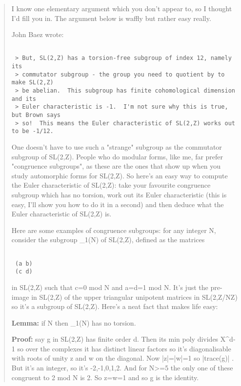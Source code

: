 \begin{quote}
 I know one elementary argument which you don't appear to, so I thought
 I'd fill you in. The argument below is waffly but rather easy really.

 John Baez wrote:


\begin{verbatim}

 > But, SL(2,Z) has a torsion-free subgroup of index 12, namely its
 > commutator subgroup - the group you need to quotient by to make SL(2,Z)
 > be abelian.  This subgroup has finite cohomological dimension and its
 > Euler characteristic is -1.  I'm not sure why this is true, but Brown says
 > so!  This means the Euler characteristic of SL(2,Z) works out to be -1/12.
\end{verbatim}
    

 One doesn't have to use such a "strange" subgroup as the commutator
 subgroup of SL(2,Z). People who do modular forms, like me, far
 prefer "congruence subgroups", as these are the ones that show
 up when you study automorphic forms for SL(2,Z). So here's an easy
 way to compute the Euler characteristic of SL(2,Z): take your
 favourite congruence subgroup which has no torsion, work out
 its Euler characteristic (this is easy, I'll show you how to do it
 in a second) and then deduce what the Euler characteristic of SL(2,Z) is.

 Here are some examples of congruence subgroups: for any integer N,
 consider the subgroup \Gamma _{1}(N) of SL(2,Z), defined as the 
matrices

\begin{verbatim}

 (a b)
 (c d)
\end{verbatim}
    
in SL(2,Z) such that c=0 mod N and a=d=1 mod N. It's just
 the pre-image in SL(2,Z) of the upper triangular unipotent matrices
 in SL(2,Z/NZ) so it's a subgroup of SL(2,Z). Here's a neat fact
 that makes life easy:

\textbf{Lemma:} if N then \Gamma _{1}(N) has no torsion.

 \textbf{Proof:} say g in SL(2,Z) has finite order d. Then its min poly
 divides X^{d}-1 so over the complexes it has distinct linear factors
 so it's diagonalisable with roots of unity z and w on the diagonal.
 Now |z|=|w|=1 so |trace(g)| . But it's an integer, so it's -2,-1,0,1,2.
 And for N>=5 the only one of these congruent to 2 mod N is 2. So z=w=1
 and so g is the identity.


\end{quote}

